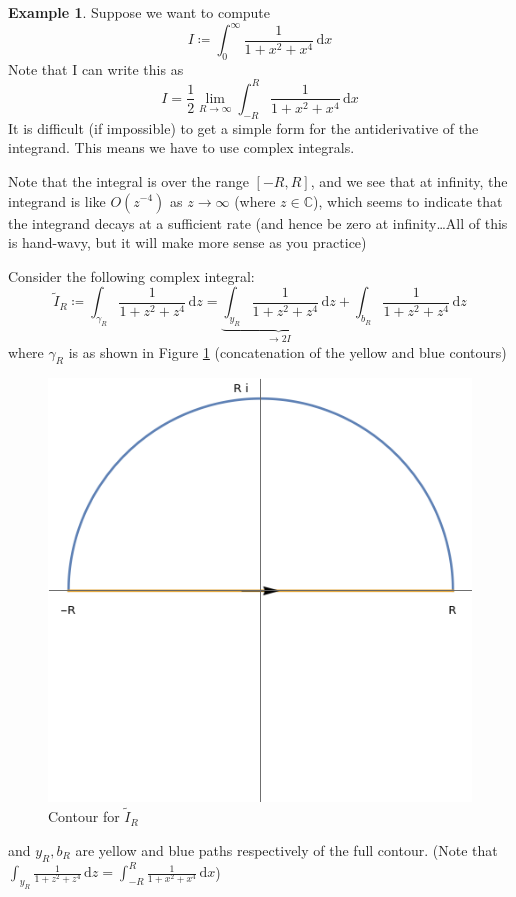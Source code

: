 \documentclass[a4paper, 12pt]{article}
\theoremstyle{definition}
\newtheorem{example}{Example}
\numberwithin{theorem}{section}
\numberwithin{definition}{section}
\numberwithin{exercise}{section}
\numberwithin{remark}{section}
\numberwithin{figure}{section}
\numberwithin{example}{section}
\newcommand{\C}{\mathbb{C}}
\newcommand{\intd}{\,\text{d}}
\begin{document}
\begin{example}
    Suppose we want to compute
    \begin{equation*}
        I \coloneqq \int_{0}^{\infty} \frac{1}{1+x^2+x^4} \intd x
    \end{equation*}
    Note that I can write this as
    \begin{equation*}
        I = \frac{1}{2} \lim_{R \rightarrow \infty} \int_{-R}^{R} \frac{1}{1+x^2+x^4} \intd x
    \end{equation*}
    It is difficult (if impossible) to get a simple form for the antiderivative of the integrand.
    This means we have to use complex integrals.

    Note that the integral is over the range $[-R, R]$, and we see that at infinity,
    the integrand is like $O\left( z^{-4} \right)$ as $z \rightarrow \infty$ (where $z \in \C$), which seems to indicate that
    the integrand decays at a sufficient rate (and hence be zero at infinity\dots All of this is hand-wavy, but it will make more sense as you practice)

    Consider the following complex integral:
    \begin{equation*}
        \tilde I_R \coloneqq \int_{\gamma_R} \frac{1}{1+z^2+z^4} \intd z 
        = \underbrace{\int_{y_R} \frac{1}{1+z^2+z^4} \intd z}_{\rightarrow 2I} + \int_{b_R} \frac{1}{1+z^2+z^4} \intd z
    \end{equation*}
    where $\gamma_R$ is as shown in Figure \ref{fig: Residue Calculus Contour 1} (concatenation of the yellow and blue contours)
    \begin{figure}[h]
        \centering
        \includegraphics{residueCalculusContour1}
        \caption{Contour for $\tilde I_R$}
        \label{fig: Residue Calculus Contour 1}
    \end{figure}
    and $y_R, b_R$ are yellow and blue paths respectively of the full contour.
    (Note that $\int_{y_R} \frac{1}{1+z^2+z^4} \intd z = \int_{-R}^R \frac{1}{1+x^2+x^4} \intd x$)


\end{example}
\end{document}

